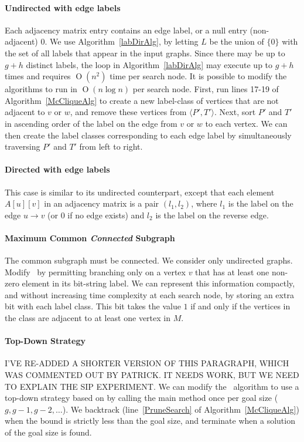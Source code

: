 \documentclass[letterpaper]{article}
\newcommand{\citet}[1]{\citeauthor{#1} \shortcite{#1}}
\newcommand{\McSplit}{\textproc{McSplit}}
\newcommand{\lineref}[1]{line~\ref{#1}}
\newcommand{\BigO}[1]{\ensuremath{\operatorname{O}\left(#1\right)}}
\begin{document}
\paragraph{Undirected with edge labels} Each adjacency matrix
entry contains an edge label, or a null entry (non-adjacent) $0$.
We use Algorithm~\ref{labDirAlg}, by letting $L$ be
the union of $\{0\}$ with the set of all labels that appear in the input
graphs. Since there may be up to $g + h$ distinct labels, the loop in
Algorithm~\ref{labDirAlg} may execute up to $g + h$ times and
requires $\BigO{n^2}$ time per search
node.  It is possible to modify the algorithms to run in $\BigO{n \log n}$ per
search node.  First, run lines 17-19
of Algorithm~\ref{McCliqueAlg} to create a new label-class of vertices that are not
adjacent to $v$ or $w$, and remove these vertices from $\langle P',T' \rangle$.
Next, sort $P'$ and $T'$ in ascending order of the label on the edge from $v$
or $w$ to each vertex. We can then create the label classes corresponding to
each edge label by simultaneously traversing $P'$ and $T'$ from left to right.

\paragraph{Directed with edge labels} This case is similar to its undirected
counterpart, except that each element $A[u][v]$ in an adjacency matrix is a
pair $(l_1, l_2)$, where $l_1$ is the label on the edge $u \rightarrow v$ (or 0
if no edge exists) and $l_2$ is the label on the reverse edge.

\paragraph{Maximum Common \emph{Connected} Subgraph} The common subgraph must
be connected. We consider only undirected graphs.  Modify \McSplit\ by
permitting branching only on a vertex $v$ that has at least one non-zero
element in its bit-string label.  We can represent this information compactly,
and without increasing time complexity at each search node, by storing an extra
bit with each label class.  This bit takes the value $1$ if and only if the vertices in
the class are adjacent to at least one vertex in $M$.

\paragraph{Top-Down Strategy} I'VE RE-ADDED A SHORTER VERSION OF THIS
PARAGRAPH, WHICH WAS COMMENTED OUT BY PATRICK. IT NEEDS WORK, BUT WE NEED TO
EXPLAIN THE SIP EXPERIMENT. We can modify the \McSplit\ algorithm to use a
top-down strategy based on \citet{UpcomingAAAIPaper} by calling the main
 method once per goal size ($g, g-1, g-2, \dots$).  We
backtrack (\lineref{PruneSearch} of Algorithm~\ref{McCliqueAlg}) when the bound is
strictly less than the goal size, and terminate when a solution of the goal
size is found.
\end{document}
